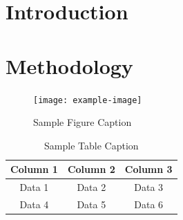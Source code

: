 \documentclass[a4paper,12pt]{article}
\begin{document}
\newpage
\listoftables

\newpage
\section{Introduction}
\lipsum[1-2]  %

\section{Methodology}
\lipsum[3-4]

\begin{figure}[h]
    \centering
    \texttt{[image: example-image]}
    \caption{Sample Figure Caption}
    \label{fig:sample}
\end{figure}

\begin{table}[h]
    \centering
    \begin{tabular}{|c|c|c|}
        \hline
        Column 1 & Column 2 & Column 3 \\
        \hline
        Data 1 & Data 2 & Data 3 \\
        Data 4 & Data 5 & Data 6 \\
        \hline
    \end{tabular}
    \caption{Sample Table Caption}
    \label{tab:sample}
\end{table}
\end{document}
